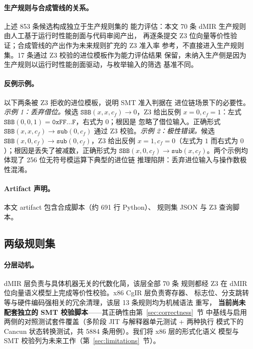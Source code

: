\paragraph{生产规则与合成管线的关系。}上述 853 条候选构成独立于生产规则集的
能力评估：本文 70 条 dMIR 生产规则由人工基于运行时性能剖面与代码审阅产出，
再逐条提交 Z3 位向量等价性验证；合成管线的产出作为未来规则扩充的 Z3 准入率
参考，不直接进入生产规则集。17 条通过 Z3 校验的进位模板作为能力评估结果
保留，未纳入生产侧是因为生产规则以运行时性能剖面驱动，与枚举输入的筛选
基准不同。

\paragraph{反例示例。}以下两条被 Z3 拒收的进位模板，说明 SMT 准入判据在
进位链场景下的必要性。\emph{示例 1：丢弃借位。}候选
$\texttt{SBB}(x, x, c_f) \to 0$，Z3 给出反例 $x = 0, c_f = 1$：左式
$\texttt{SBB}(0, 0, 1) = \texttt{0xFF}\ldots\texttt{F}$，右式为 $0$；根因是
忽略了借位输入。正确形式 $\texttt{SBB}(x, x, c_f) \to \texttt{sub}(0, c_f)$
通过 Z3 校验。\emph{示例 2：极性错误。}候选 $\texttt{SBB}(x, 0, c_f) \to
\texttt{sub}(0, c_f)$，Z3 给出反例 $x = 1, c_f = 0$（左式为 $1$ 而右式为
$0$）；根因是丢失了被减数，正确形式为 $\texttt{SBB}(x, 0, c_f) \to
\texttt{sub}(x, c_f)$。两个示例均体现了 256 位无符号模运算下典型的进位链
推理陷阱：丢弃进位输入与操作数极性混淆。

\paragraph{Artifact 声明。}本文 artifact 包含合成脚本（约 691 行 Python）、
规则集 JSON 与 Z3 查询脚本。

\subsection{两级规则集}

\paragraph{分层动机。}dMIR 层负责与具体机器无关的代数化简，该层全部 70 条
规则都经 Z3 在 dMIR 位向量语义模型上完成等价性校验。x86 CgIR 层负责寄存器、
标志位、分支跳转等与硬件编码强相关的冗余清理，该层 13 条规则均为机械语法
重写，
\textbf{当前尚未配套独立的 SMT 校验脚本}——其正确性由第~\ref{sec:correctness}~节
中基线与启用两侧的对照测试套件覆盖（多阶段 JIT 与解释器单元测试 + 两种执行
模式下的 Cancun 状态转换测试，共 5884 条用例）。我们将 x86 层的形式化语义
模型与 SMT 校验列为未来工作（第~\ref{sec:limitations}~节）。

